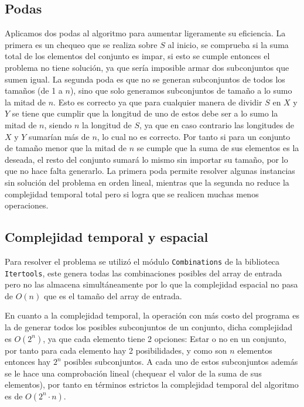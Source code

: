 \documentclass[11pt]{article}
\begin{document}
    \subsection{Podas}
    Aplicamos dos podas al algoritmo para aumentar ligeramente su eficiencia. La primera es un chequeo que se realiza sobre $S$ al
    inicio, se comprueba si la suma total de los elementos del conjunto es impar, si esto se cumple entonces el problema no tiene
    solución, ya que sería imposible armar dos subconjuntos que sumen igual. La segunda poda es que no se generan subconjuntos de todos
    los tamaños (de 1 a $n$), sino que solo generamos subconjuntos de tamaño a lo sumo la mitad de $n$. Esto es correcto ya que para cualquier
    manera de dividir $S$ en $X$ y $Y$ se tiene que cumplir que la longitud de uno de estos debe ser a lo sumo la mitad de $n$, siendo $n$ la
    longitud de $S$, ya que en caso contrario las longitudes de $X$ y $Y$ sumarían más de $n$, lo cual no es correcto. Por tanto si para un conjunto
    de tamaño menor que la mitad de $n$ se cumple que la suma de sus elementos es la deseada, el resto del conjunto sumará lo mismo sin importar
    su tamaño, por lo que no hace falta generarlo. La primera poda permite resolver algunas instancias sin solución del problema
    en orden lineal, mientras que la segunda no reduce la complejidad temporal total pero si logra que se realicen muchas menos
    operaciones.

    \subsection{Complejidad temporal y espacial}
    Para resolver el problema se utilizó el módulo \texttt{Combinations} de la biblioteca \texttt{Itertools}, este genera todas
    las combinaciones posibles del array de entrada pero no las almacena simultáneamente por lo que la complejidad espacial no pasa 
    de $O(n)$ que es el tamaño del array de entrada.

    En cuanto a la complejidad temporal, la operación con más costo del programa es la de generar todos los posibles subconjuntos de
    un conjunto, dicha complejidad es $O(2^n)$, ya que cada elemento tiene 2 opciones: Estar o no en un conjunto, por tanto
    para cada elemento hay 2 posibilidades, y como son $n$ elementos entonces hay $2^n$ posibles subconjuntos. A cada uno de estos
    subconjuntos además se le hace una comprobación lineal (chequear el valor de la suma de sus elementos), por tanto en términos
    estrictos la complejidad temporal del algoritmo es de $O(2^n \cdot n)$.
\end{document}
